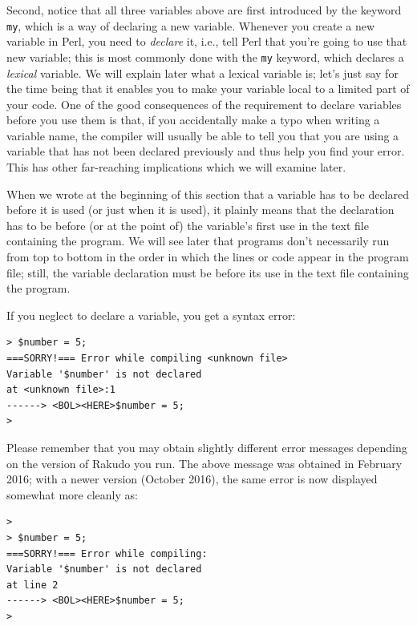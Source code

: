 Second, notice that all three variables above are first 
introduced by the keyword {\tt my}, which is a way of 
declaring a new variable. Whenever you create a new 
variable in Perl, you need to \emph{declare} it, 
i.e., tell Perl that you're going to use that new 
variable; this is most commonly done with the 
{\tt my} keyword, which declares a \emph{lexical} variable. 
We will explain later what a lexical variable is; let's 
just say for the time being that it enables you to 
make your variable local to a limited part of your code. 
One of the good consequences of the requirement to declare 
variables before you use them is that, if you accidentally 
make a typo when writing a variable name, the compiler 
will usually be able to tell you that you are using a 
variable that has not been declared previously and 
thus help you find your error. This has other far-reaching 
implications which we will examine later.

When we wrote at the beginning of this section that a variable has 
to be declared before it is used (or just when it is used), it plainly 
means that the declaration has to be before (or at the point of) the 
variable's first use in the text file containing the program. We will see later that 
programs don't necessarily run from top to bottom in the order in which 
the lines or code appear in the program file; still, the variable 
declaration must be before its use in the text file containing the program.

If you neglect to declare a variable, you get a syntax error:

\begin{verbatim}
> $number = 5;
===SORRY!=== Error while compiling <unknown file>
Variable '$number' is not declared
at <unknown file>:1
------> <BOL><HERE>$number = 5;
>
\end{verbatim}
%
Please remember that you may obtain slightly different 
error messages depending on the version of Rakudo you 
run. The above message was obtained in February 2016; 
with a newer version (October 2016), the same error 
is now displayed somewhat more cleanly as:
\begin{verbatim}
>
> $number = 5;
===SORRY!=== Error while compiling:
Variable '$number' is not declared
at line 2
------> <BOL><HERE>$number = 5;
>
\end{verbatim}


